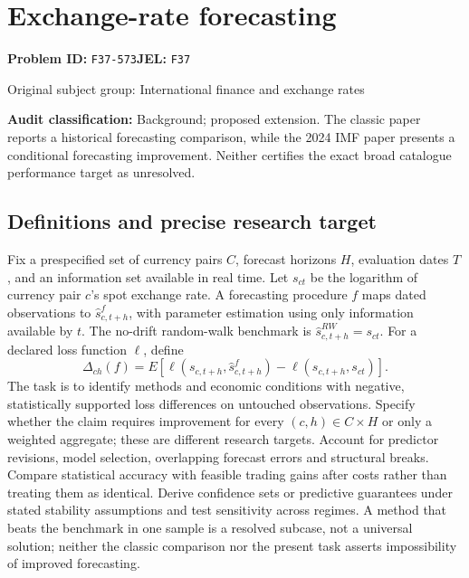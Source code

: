 \documentclass[11pt,a4paper]{article}
\begin{document}
\section*{Exchange-rate forecasting}
\textbf{Problem ID:} \texttt{F37-573}\quad \textbf{JEL:} \texttt{F37}\par
\label{problem:OP-0330}
{\sffamily\small\color{muted}Original subject group: International finance and exchange rates\par}
\label{definitions:problem:30007612}
\textbf{Audit classification:} Background; proposed extension. The classic paper reports a historical forecasting comparison, while the 2024 IMF paper presents a conditional forecasting improvement. Neither certifies the exact broad catalogue performance target as unresolved.
\subsection*{Definitions and precise research target}
Fix a prespecified set of currency pairs \(C\), forecast horizons \(H\), evaluation dates \(T\), and an information set available in real time. Let \(s_{ct}\) be the logarithm of currency pair \(c\)'s spot exchange rate. A forecasting procedure \(f\) maps dated observations to \(\widehat s^f_{c,t+h}\), with parameter estimation using only information available by \(t\). The no-drift random-walk benchmark is \(\widehat s^{RW}_{c,t+h}=s_{ct}\). For a declared loss function \(\ell\), define
\[\Delta_{ch}(f)=E[\ell(s_{c,t+h},\widehat s^f_{c,t+h})-\ell(s_{c,t+h},s_{ct})].\]
The task is to identify methods and economic conditions with negative, statistically supported loss differences on untouched observations. Specify whether the claim requires improvement for every \((c,h)\in C\times H\) or only a weighted aggregate; these are different research targets. Account for predictor revisions, model selection, overlapping forecast errors and structural breaks. Compare statistical accuracy with feasible trading gains after costs rather than treating them as identical. Derive confidence sets or predictive guarantees under stated stability assumptions and test sensitivity across regimes. A method that beats the benchmark in one sample is a resolved subcase, not a universal solution; neither the classic comparison nor the present task asserts impossibility of improved forecasting.
\end{document}
